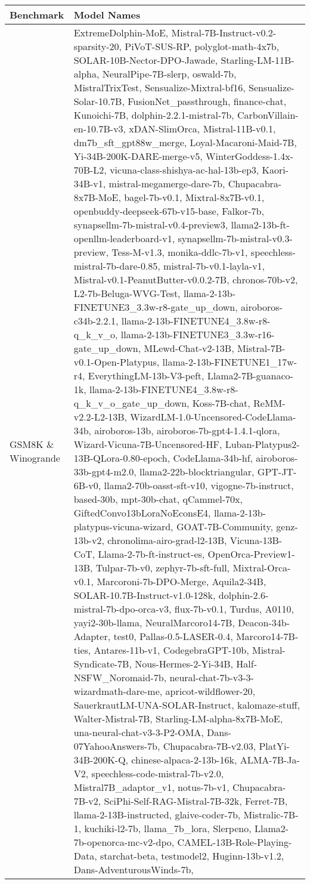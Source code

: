 \begin{table*}[htbp]
    \renewcommand{\arraystretch}{1.2}
    \centering
    \small
    \setlength{\tabcolsep}{0.5em} %
    \begin{tabular}{p{2cm}p{12cm}}
        \toprule
        \textbf{Benchmark} & \textbf{Model Names} \\
        \midrule
        GSM8K \& Winogrande & ExtremeDolphin-MoE, Mistral-7B-Instruct-v0.2-sparsity-20, PiVoT-SUS-RP, polyglot-math-4x7b, SOLAR-10B-Nector-DPO-Jawade, Starling-LM-11B-alpha, NeuralPipe-7B-slerp, oswald-7b, MistralTrixTest, Sensualize-Mixtral-bf16, Sensualize-Solar-10.7B, FusionNet\_passthrough, finance-chat, Kunoichi-7B, dolphin-2.2.1-mistral-7b, CarbonVillain-en-10.7B-v3, xDAN-SlimOrca, Mistral-11B-v0.1, dm7b\_sft\_gpt88w\_merge, Loyal-Macaroni-Maid-7B, Yi-34B-200K-DARE-merge-v5, WinterGoddess-1.4x-70B-L2, vicuna-class-shishya-ac-hal-13b-ep3, Kaori-34B-v1, mistral-megamerge-dare-7b, Chupacabra-8x7B-MoE, bagel-7b-v0.1, Mixtral-8x7B-v0.1, openbuddy-deepseek-67b-v15-base, Falkor-7b, synapsellm-7b-mistral-v0.4-preview3, llama2-13b-ft-openllm-leaderboard-v1, synapsellm-7b-mistral-v0.3-preview, Tess-M-v1.3, monika-ddlc-7b-v1, speechless-mistral-7b-dare-0.85, mistral-7b-v0.1-layla-v1, Mistral-v0.1-PeanutButter-v0.0.2-7B, chronos-70b-v2, L2-7b-Beluga-WVG-Test, llama-2-13b-FINETUNE3\_3.3w-r8-gate\_up\_down, airoboros-c34b-2.2.1, llama-2-13b-FINETUNE4\_3.8w-r8-q\_k\_v\_o, llama-2-13b-FINETUNE3\_3.3w-r16-gate\_up\_down, MLewd-Chat-v2-13B, Mistral-7B-v0.1-Open-Platypus, llama-2-13b-FINETUNE1\_17w-r4, EverythingLM-13b-V3-peft, Llama2-7B-guanaco-1k, llama-2-13b-FINETUNE4\_3.8w-r8-q\_k\_v\_o\_gate\_up\_down, Koss-7B-chat, ReMM-v2.2-L2-13B, WizardLM-1.0-Uncensored-CodeLlama-34b, airoboros-13b, airoboros-7b-gpt4-1.4.1-qlora, Wizard-Vicuna-7B-Uncensored-HF, Luban-Platypus2-13B-QLora-0.80-epoch, CodeLlama-34b-hf, airoboros-33b-gpt4-m2.0, llama2-22b-blocktriangular, GPT-JT-6B-v0, llama2-70b-oasst-sft-v10, vigogne-7b-instruct, based-30b, mpt-30b-chat, qCammel-70x, GiftedConvo13bLoraNoEconsE4, llama-2-13b-platypus-vicuna-wizard, GOAT-7B-Community, genz-13b-v2, chronolima-airo-grad-l2-13B, Vicuna-13B-CoT, Llama-2-7b-ft-instruct-es, OpenOrca-Preview1-13B, Tulpar-7b-v0, zephyr-7b-sft-full, Mixtral-Orca-v0.1, Marcoroni-7b-DPO-Merge, Aquila2-34B, SOLAR-10.7B-Instruct-v1.0-128k, dolphin-2.6-mistral-7b-dpo-orca-v3, flux-7b-v0.1, Turdus, A0110, yayi2-30b-llama, NeuralMarcoro14-7B, Deacon-34b-Adapter, test0, Pallas-0.5-LASER-0.4, Marcoro14-7B-ties, Antares-11b-v1, CodegebraGPT-10b, Mistral-Syndicate-7B, Nous-Hermes-2-Yi-34B, Half-NSFW\_Noromaid-7b, neural-chat-7b-v3-3-wizardmath-dare-me, apricot-wildflower-20, SauerkrautLM-UNA-SOLAR-Instruct, kalomaze-stuff, Walter-Mistral-7B, Starling-LM-alpha-8x7B-MoE, una-neural-chat-v3-3-P2-OMA, Dans-07YahooAnswers-7b, Chupacabra-7B-v2.03, PlatYi-34B-200K-Q, chinese-alpaca-2-13b-16k, ALMA-7B-Ja-V2, speechless-code-mistral-7b-v2.0, Mistral7B\_adaptor\_v1, notus-7b-v1, Chupacabra-7B-v2, SciPhi-Self-RAG-Mistral-7B-32k, Ferret-7B, llama-2-13B-instructed, glaive-coder-7b, Mistralic-7B-1, kuchiki-l2-7b, llama\_7b\_lora, Slerpeno, Llama2-7b-openorca-mc-v2-dpo, CAMEL-13B-Role-Playing-Data, starchat-beta, testmodel2, Huginn-13b-v1.2, Dans-AdventurousWinds-7b, 
\end{tabular}
\end{table*}
